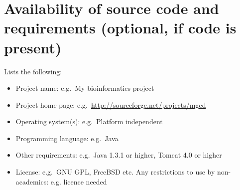 \documentclass[a4paper,num-refs]{oup-contemporary}
\begin{document}

\section{Availability of source code and requirements (optional, if code is present)}

Lists the following:
\begin{itemize}
\item Project name: e.g.~My bioinformatics project
\item Project home page: e.g.~\url{http://sourceforge.net/projects/mged}
\item Operating system(s): e.g.~Platform independent
\item Programming language: e.g.~Java
\item Other requirements: e.g.~Java 1.3.1 or higher, Tomcat 4.0 or higher
\item License: e.g.~GNU GPL, FreeBSD etc.
Any restrictions to use by non-academics: e.g. licence needed
\end{itemize}
\end{document}
